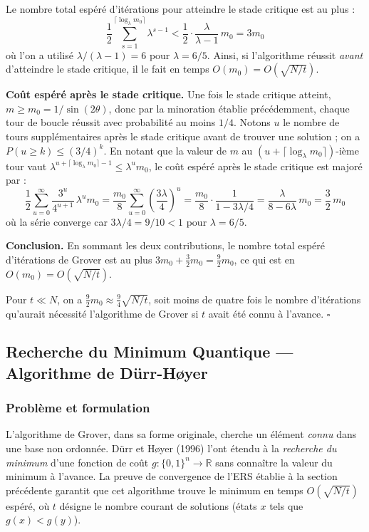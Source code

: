 \documentclass{ceri/sty/rapport}
\begin{document}
Le nombre total espéré d'itérations pour atteindre le stade critique est au plus :
\[
\frac{1}{2}\sum_{s=1}^{\lceil \log_\lambda m_0 \rceil} \lambda^{s-1}
< \frac{1}{2} \cdot \frac{\lambda}{\lambda - 1}\, m_0
= 3m_0
\]
où l'on a utilisé $\lambda/(\lambda-1) = 6$ pour $\lambda = 6/5$.
Ainsi, si l'algorithme réussit \emph{avant} d'atteindre le stade critique, il le fait en temps $O(m_0) = O(\sqrt{N/t})$.

\medskip\noindent\textbf{Coût espéré après le stade critique.}
Une fois le stade critique atteint, $m \ge m_0 = 1/\sin(2\theta)$, donc par la minoration établie précédemment, chaque tour de boucle réussit avec probabilité au moins $1/4$.
Notons $u$ le nombre de tours supplémentaires après le stade critique avant de trouver une solution ; on a $P(u \ge k) \le (3/4)^k$.
En notant que la valeur de $m$ au $(u+\lceil \log_\lambda m_0 \rceil)$-ième tour vaut $\lambda^{u + \lceil \log_\lambda m_0 \rceil - 1} \le \lambda^u m_0$, le coût espéré après le stade critique est majoré par :
\[
\frac{1}{2}\sum_{u=0}^{\infty} \frac{3^u}{4^{u+1}}\,\lambda^u m_0
= \frac{m_0}{8}\sum_{u=0}^{\infty}\left(\frac{3\lambda}{4}\right)^u
= \frac{m_0}{8} \cdot \frac{1}{1 - 3\lambda/4}
= \frac{\lambda}{8 - 6\lambda}\, m_0
= \frac{3}{2}\,m_0
\]
où la série converge car $3\lambda/4 = 9/10 < 1$ pour $\lambda = 6/5$.

\medskip\noindent\textbf{Conclusion.}
En sommant les deux contributions, le nombre total espéré d'itérations de Grover est au plus $3m_0 + \frac{3}{2}m_0 = \frac{9}{2}m_0$, ce qui est en $O(m_0) = O(\sqrt{N/t})$.

Pour $t \ll N$, on a $\frac{9}{2}m_0 \approx \frac{9}{4}\sqrt{N/t}$, soit moins de quatre fois le nombre d'itérations qu'aurait nécessité l'algorithme de Grover si $t$ avait été connu à l'avance. $\square$

\subsection{Recherche du Minimum Quantique — Algorithme de Dürr-Høyer}

\subsubsection{Problème et formulation}

L'algorithme de Grover, dans sa forme originale, cherche un élément \emph{connu} dans
une base non ordonnée. Dürr et Høyer (1996) l'ont étendu à la \emph{recherche du
minimum} d'une fonction de coût $g : \{0,1\}^n \to \mathbb{R}$ sans connaître la valeur
du minimum à l'avance. La preuve de convergence de l'ERS établie à la section
précédente garantit que cet algorithme trouve le minimum en temps $O(\sqrt{N/t})$
espéré, où $t$ désigne le nombre courant de solutions (états $x$ tels que $g(x) < g(y)$).
\end{document}
